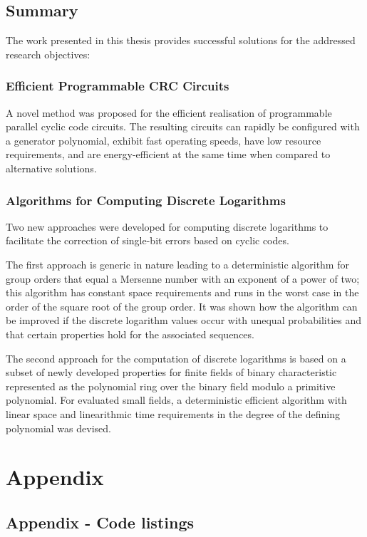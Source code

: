 \documentclass[oneside, a4paper, 11pt]{memoir}
\begin{document}
\section{Summary}
The work presented in this thesis provides successful solutions for the addressed research objectives:

\subsection{Efficient Programmable CRC Circuits}

A novel method was proposed for the efficient realisation of programmable parallel cyclic code circuits. The resulting circuits can rapidly be configured with a generator polynomial, exhibit fast operating speeds, have low resource requirements, and are energy-efficient at the same time when compared to alternative solutions.

\subsection{Algorithms for Computing Discrete Logarithms}

Two new approaches were developed for computing discrete logarithms to facilitate the correction of single-bit errors based on cyclic codes.

The first approach is generic in nature leading to a deterministic algorithm for group orders that equal a Mersenne number with an exponent of a power of two; this algorithm has constant space requirements and runs in the worst case in the order of the square root of the group order. It was shown how the algorithm can be improved if the discrete logarithm values occur with unequal probabilities and that certain properties hold for the associated sequences.

The second approach for the computation of discrete logarithms is based on a subset of newly developed properties for finite fields of binary characteristic represented as the polynomial ring over the binary field modulo a primitive polynomial. For evaluated small fields, a deterministic efficient algorithm with linear space and linearithmic time requirements in the degree of the defining polynomial was devised.

\newpage
\chapter*{Appendix}
\section*{Appendix - Code listings}
\begin{multicols}{2}
\inputminted[fontsize=\tiny]{c}{code/dumpBounce.c}
\end{multicols}

\begin{multicols}{2}
\inputminted[fontsize=\tiny]{python}{code/backpressure.py}
\end{multicols}

\begin{multicols}{2}
\inputminted[fontsize=\tiny]{python}{code/bursting.py}
\end{multicols}
\end{document}
